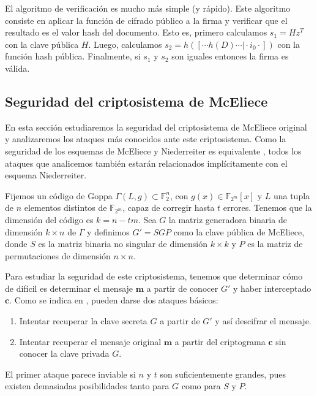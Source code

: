 El algoritmo de verificación es mucho más simple (y rápido). Este algoritmo consiste en aplicar la función de cifrado público a la firma y verificar que el resultado es el valor hash del documento. Esto es, primero calculamos $s_1 = Hz^T$ con la clave pública $H$. Luego, calculamos $s_2 = h([\cdots h(D) \cdots \vert \cdot i_0 \cdot])$ con la función hash pública. Finalmente, si $s_1$ y $s_2$ son iguales entonces la firma es válida.

\subsection{Seguridad del criptosistema de McEliece}

En esta sección estudiaremos la seguridad del criptosistema de McEliece original y analizaremos los ataques más conocidos ante este criptosistema. Como la seguridad de los esquemas de McEliece y Niederreiter es equivalente \cite{Equivalence_McEliece_Niederreiter}, todos los ataques que analicemos también estarán relacionados implícitamente con el esquema Niederreiter.

Fijemos un código de Goppa $\Gamma(L, g) \subset \mathbb{F}_2^n$, con $g(x) \in \mathbb{F}_{2^m}[x]$ y $L$ una tupla de $n$ elementos distintos de $\mathbb{F}_{2^m}$, capaz de corregir hasta $t$ errores. Tenemos que la dimensión del código es $k = n - tm$. Sea $G$ la matriz generadora binaria de dimensión $k \times n$ de $\Gamma$ y definimos $G' = SGP$ como la clave pública de McEliece, donde $S$ es la matriz binaria no singular de dimensión $k \times k$ y $P$ es la matriz de permutaciones de dimensión $n \times n$.

Para estudiar la seguridad de este criptosistema, tenemos que determinar cómo de difícil es determinar el mensaje $\textbf{m}$ a partir de conocer $G'$ y haber interceptado $\textbf{c}$. Como se indica en \cite{McEliece_1978}, pueden darse dos ataques básicos:

\begin{enumerate}
    \item Intentar recuperar la clave secreta $G$ a partir de $G'$ y así descifrar el mensaje.
    \item Intentar recuperar el mensaje original $\textbf{m}$ a partir del criptograma $\textbf{c}$ sin conocer la clave privada $G$.
\end{enumerate}

El primer ataque parece inviable si $n$ y $t$ son suficientemente grandes, pues existen demasiadas posibilidades tanto para $G$ como para $S$ y $P$.

